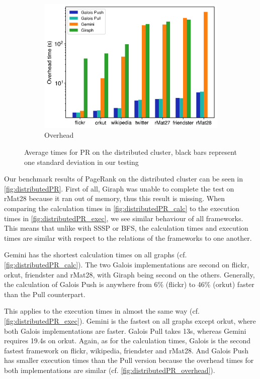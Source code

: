 \begin{figure}
\begin{subfigure}{0.32\textwidth}
		\includegraphics[width=\linewidth]{../../plots/distributedPR_overheadTime.png}
		\caption{Overhead}
		\label{fig:distributedPR_overhead}
	\end{subfigure}
	\hfil
	\caption{Average times for PR on the distributed cluster, black bars represent one standard deviation in our testing}
	\label{fig:distributedPR}
\end{figure}

Our benchmark results of PageRank on the distributed cluster can be seen in \autoref{fig:distributedPR}.
First of all, Giraph was unable to complete the test on rMat28 because it ran out of memory, thus this result is missing.
When comparing the calculation times in \autoref{fig:distributedPR_calc} to the execution times in \autoref{fig:distributedPR_exec}, we see similar behaviour of all frameworks.
This means that unlike with SSSP or BFS, the calculation times and execution times are similar with respect to the relations of the frameworks to one another.

Gemini has the shortest calculation times on all graphs (cf. \autoref{fig:distributedPR_calc}).
The two Galois implementations are second on flickr, orkut, friendster and rMat28, with Giraph being second on the others.
Generally, the calculation of Galois Push is anywhere from 6\% (flickr) to 46\% (orkut) faster than the Pull counterpart.

This applies to the execution times in almost the same way (cf. \autoref{fig:distributedPR_exec}).
Gemini is the fastest on all graphs except orkut, where both Galois implementations are faster. Galois Pull takes 13s, whereas Gemini requires 19.4s on orkut.
Again, as for the calculation times, Galois is the second fastest framework on flickr, wikipedia, friendster and rMat28.
And Galois Push has smaller execution times than the Pull version because the overhead times for both implementations are similar (cf. \autoref{fig:distributedPR_overhead}).


